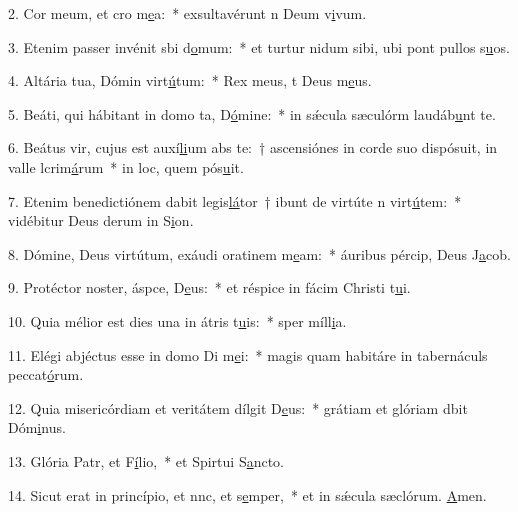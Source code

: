 2. Cor meum, et cro m\uline{e}a:~* exsultavérunt n Deum v\uline{i}vum.\par 
3. Etenim passer invénit sbi d\uline{o}mum:~* et turtur nidum sibi, ubi pont pullos s\uline{u}os.\par 
4. Altária tua, Dómin virt\uline{ú}tum:~* Rex meus, t Deus m\uline{e}us.\par 
5. Beáti, qui hábitant in domo ta, D\uline{ó}mine:~* in sǽcula sæculórm laudáb\uline{u}nt te.\par 
6. Beátus vir, cujus est auxí\uline{li}um abs te:~† ascensiónes in corde suo dispósuit, in valle lcrim\uline{á}rum~* in loc, quem pós\uline{u}it.\par 
7. Etenim benedictiónem dabit legis\uline{lá}tor~† ibunt de virtúte n virt\uline{ú}tem:~* vidébitur Deus derum in S\uline{i}on.\par 
8. Dómine, Deus virtútum, exáudi oratinem m\uline{e}am:~* áuribus pércip, Deus J\uline{a}cob.\par 
9. Protéctor noster, áspce, D\uline{e}us:~* et réspice in fácim Christi t\uline{u}i.\par 
10. Quia mélior est dies una in átris t\uline{u}is:~* sper míll\uline{i}a.\par 
11. Elégi abjéctus esse in domo Di m\uline{e}i:~* magis quam habitáre in tabernáculs peccat\uline{ó}rum.\par 
12. Quia misericórdiam et veritátem dílgit D\uline{e}us:~* grátiam et glóriam dbit Dóm\uline{i}nus.\par 
13. Glória Patr, et F\uline{í}lio,~* et Spirtui S\uline{a}ncto.\par 
14. Sicut erat in princípio, et nnc, et s\uline{e}mper,~* et in sǽcula sæclórum. \uline{A}men.\par 
